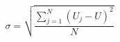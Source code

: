 \documentclass[A4,11pt]{article}
\begin{document}
\thispagestyle{empty}
$$
\sigma = \sqrt{\frac{\sum\limits_{j=1}^N (U_j-U)^2}{N}} 
$$
\end{document}
